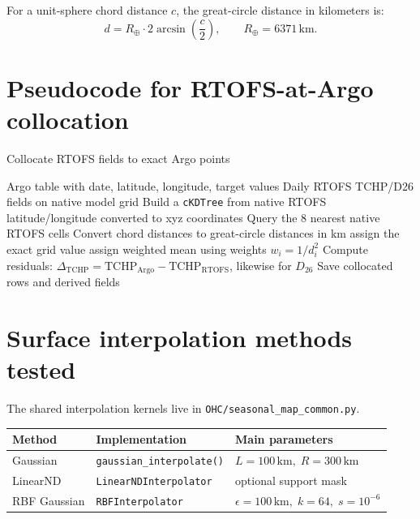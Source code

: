 \documentclass[11pt]{report}
\newcommand{\code}[1]{\texttt{#1}}
\newcommand{\km}{\ensuremath{\,\mathrm{km}}}
\newcommand{\R}{\ensuremath{R_\oplus}}
\newcommand{\TCHP}{\ensuremath{\mathrm{TCHP}}}
\newcommand{\Dtwentysix}{\ensuremath{D_{26}}}
\begin{document}
For a unit-sphere chord distance \(c\), the great-circle distance in kilometers is:
\begin{equation}
d = \R \cdot 2\arcsin\left(\frac{c}{2}\right), \qquad \R = 6371\,\mathrm{km}.
\end{equation}

\section{Pseudocode for RTOFS-at-Argo collocation}
\begin{algorithm}[H]
\caption{Collocate RTOFS fields to exact Argo points}
\begin{algorithmic}[1]
\Require Argo table with date, latitude, longitude, target values
\Require Daily RTOFS TCHP/D26 fields on native model grid
\State Build a \code{cKDTree} from native RTOFS latitude/longitude converted to xyz coordinates
    \State Query the 8 nearest native RTOFS cells
    \State Convert chord distances to great-circle distances in km
        \State assign the exact grid value
    \Else
        \State assign weighted mean using weights \(w_i = 1 / d_i^2\)
    \EndIf
\EndFor
\State Compute residuals: \(\Delta_{\TCHP} = \TCHP_{\mathrm{Argo}} - \TCHP_{\mathrm{RTOFS}}\), likewise for \Dtwentysix{}
\State Save collocated rows and derived fields
\end{algorithmic}
\end{algorithm}

\section{Surface interpolation methods tested}
The shared interpolation kernels live in \code{OHC/seasonal\_map\_common.py}.

\begin{table}[H]
\centering
\small
\begin{tabular}{P{0.20\textwidth} P{0.27\textwidth} P{0.37\textwidth}}
\toprule
Method & Implementation & Main parameters \\
\midrule
Gaussian & \code{gaussian\_interpolate()} & \(L=100\km,\;R=300\km\) \\
LinearND & \code{LinearNDInterpolator} & optional support mask \\
RBF Gaussian & \code{RBFInterpolator} & \(\epsilon=100\km,\;k=64,\;s=10^{-6}\) \\
\bottomrule
\end{tabular}
\normalsize
\end{table}
\end{document}
